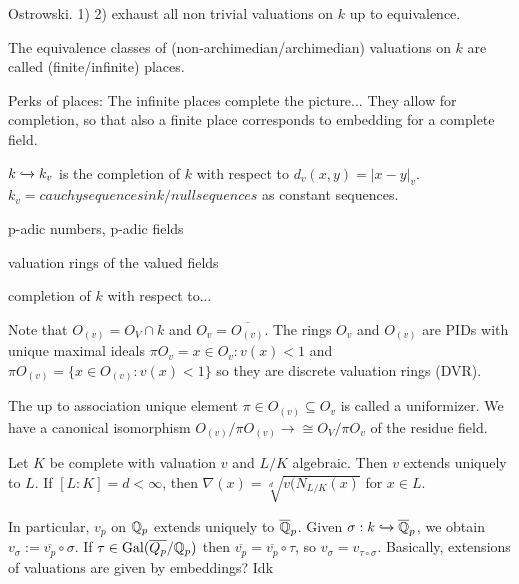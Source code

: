 \begin{outline}
\0 \begin{theorem}
    Ostrowski. 
    1)
    2) 
    exhaust all non trivial valuations on $k$ up to equivalence.
\end{theorem}

\0 \begin{definition}
    The equivalence classes of (non-archimedian/archimedian) valuations on $k$ are called (finite/infinite) places.
\end{definition}

Perks of places: The infinite places complete the picture... They allow for completion, so that also a finite place corresponds to embedding for a complete field. 

\0 \begin{definition}
    $k \xhookrightarrow{} k_v$ is the completion of $k$ with respect to $d_v(x,y)=|x-y|_v$. $k_v=cauchysequences in k / null sequences$ as constant sequences.  
\end{definition}

\0 p-adic numbers, p-adic fields

\0 \begin{definition}
    valuation rings of the valued fields
\end{definition}

\0 \begin{definition}
    completion of $k$ with respect to... 
\end{definition}

\0 Note that $O_{(v)}=O_V \cap k$ and $O_v = \overline{O_{(v)}}$. The rings $O_v$ and $O_{(v)}$ are PIDs with unique maximal ideals $\pi O_v={x\in O_v : v(x) <1}$ and $\pi O_{(v)}=\{x\in O_{(v)}:v(x)<1\}$ so they are discrete valuation rings (DVR).

\0 The up to association unique element $\pi\in O_{(v)}\subseteq O_v$ is called a uniformizer. We have a canonical isomorphism $O_{(v)}/\pi O_{(v)}\rightarrow \cong O_V / \pi O_v$ of the residue field.

\0 \begin{theorem}
    Let $K$ be complete with valuation $v$ and $L/K$ algebraic. Then $v$ extends uniquely to $L$. If $[L:K]=d < \infty$, then $\nabla(x)=\sqrt[d]{v(N_{L/K}(x)}$ for $x\in L$.
\end{theorem}

\0 In particular, $v_p$ on $\mathbb{Q}_p$ extends uniquely to $\overline{\mathbb{Q}}_p$. Given $\sigma:k\xhookrightarrow{} \overline{\mathbb{Q}}_p$, we obtain $v_\sigma := \overline{v_p}\circ \sigma$. If $\tau \in \operatorname{Gal}({\overline{Q_p}/\mathbb{Q}_p})$ then $\overline{v_p}=\overline{v_p}\circ \tau$, so $v_\sigma = v_{\tau \circ \sigma}$. Basically, extensions of valuations are given by embeddings? Idk


\end{outline}
